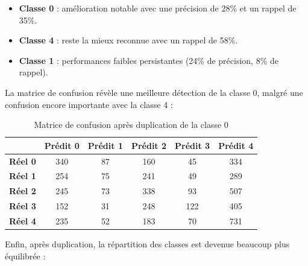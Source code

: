\documentclass[a4paper,12pt]{article}
\begin{document}
\begin{itemize}

    \item \textbf{Classe 0} : amélioration notable avec une précision de 28\% et un rappel de 35\%.

    \item \textbf{Classe 4} : reste la mieux reconnue avec un rappel de 58\%.

    \item \textbf{Classe 1} : performances faibles persistantes (24\% de précision, 8\% de rappel).

\end{itemize}
 
\bigskip
 
La matrice de confusion révèle une meilleure détection de la classe 0, malgré une confusion encore importante avec la classe 4 :
 
\begin{table}[h]

\centering

\begin{tabular}{|c|c|c|c|c|c|}

\hline
& \textbf{Prédit 0} & \textbf{Prédit 1} & \textbf{Prédit 2} & \textbf{Prédit 3} & \textbf{Prédit 4} \\ \hline

\textbf{Réel 0} & 340 & 87 & 160 & 45 & 334 \\ \hline

\textbf{Réel 1} & 254 & 75 & 241 & 49 & 289 \\ \hline

\textbf{Réel 2} & 245 & 73 & 338 & 93 & 507 \\ \hline

\textbf{Réel 3} & 152 & 31 & 248 & 122 & 405 \\ \hline

\textbf{Réel 4} & 235 & 52 & 183 & 70 & 731 \\ \hline

\end{tabular}

\caption{Matrice de confusion après duplication de la classe 0}

\end{table}
 
\bigskip
 
Enfin, après duplication, la répartition des classes est devenue beaucoup plus équilibrée :
 
\end{document}
